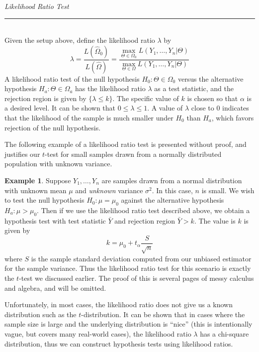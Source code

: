 \documentclass[12pt]{article}
\theoremstyle{definition}
\newtheorem*{example}{Example}
\theoremstyle{remark}
\begin{document}
\begin{framed}
\emph{Likelihood Ratio Test}\\
  \rule{\dimexpr{}\fboxrule}{.1pt} \\
Given the setup above, define the likelihood ratio $\lambda$ by 
\[
\lambda = \dfrac{L(\hat{\Omega}_0) }{L(\hat{\Omega}) } = \dfrac{ \max_{\Theta \in \Omega_0} L(Y_1, \dots, Y_n|\Theta)}{ \max_{\Theta \in \Omega} L(Y_1, \dots, Y_n|\Theta) }
\]
A likelihood ratio test of the null hypothesis $H_0: \Theta \in \Omega_0$ versus the alternative hypothesis $H_a: \Theta \in \Omega_a$ has the likelihood ratio $\lambda$ as a test statistic, and the rejection region is given by $\{ \lambda \leq k\}$. The specific value of $k$ is chosen so that $\alpha$ is a desired level. It can be shown that $0 \leq \lambda \leq 1$. A value of $\lambda$ close to 0 indicates that the likelihood of the sample is much smaller under $H_0$ than $H_a$, which favors rejection of the null hypothesis.
\end{framed}

The following example of a likelihood ratio test is presented without proof, and justifies our $t$-test for small samples drawn from a normally distributed population with unknown variance.

\begin{example}
Suppose $Y_1, \dots, Y_n$ are samples drawn from a normal distribution with unknown mean $\mu$ and \emph{unknown} variance $\sigma^2$. In this case, $n$ is small. We wish to test the null hypothesis $H_0: \mu = \mu_0$ against the alternative hypothesis $H_a: \mu > \mu_0$. Then if we use the likelihood ratio test described above, we obtain a hypothesis test with test statistic $\bar{Y}$ and rejection region $\bar{Y} > k$. The value is $k$ is given by
\[
k = \mu_0 + t_\alpha\frac{S}{\sqrt{n}}
\]
where $S$ is the sample standard deviation computed from our unbiased estimator for the sample variance. Thus the likelihood ratio test for this scenario is exactly the $t$-test we discussed earlier. The proof of this is several pages of messy calculus and algebra, and will be omitted.
\end{example}


Unfortunately, in most cases, the likelihood ratio does not give us a known distribution such as the $t$-distribution. It can be shown that in cases where the sample size is large and the underlying distribution is ``nice'' (this is intentionally vague, but covers many real-world cases), the likelihood ratio $\lambda$ has a chi-square distribution, thus we can construct hypothesis tests using likelihood ratios.
\end{document}
